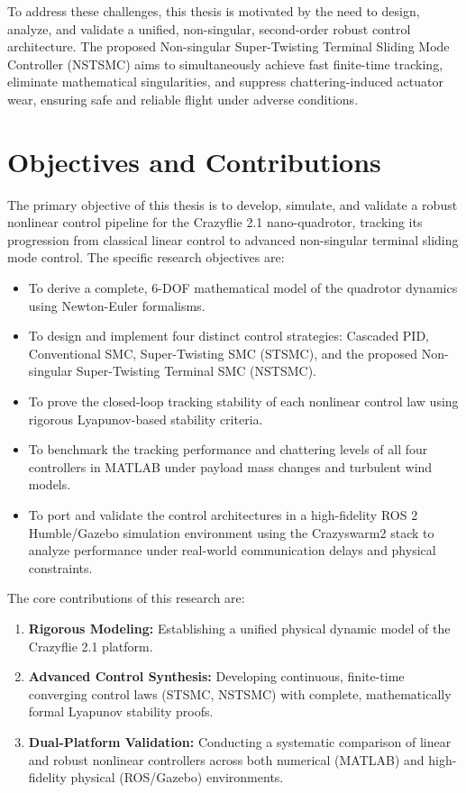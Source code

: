 To address these challenges, this thesis is motivated by the need to design, analyze, and validate a unified, non-singular, second-order robust control architecture. The proposed Non-singular Super-Twisting Terminal Sliding Mode Controller (NSTSMC) aims to simultaneously achieve fast finite-time tracking, eliminate mathematical singularities, and suppress chattering-induced actuator wear, ensuring safe and reliable flight under adverse conditions.

\section{Objectives and Contributions}
The primary objective of this thesis is to develop, simulate, and validate a robust nonlinear control pipeline for the Crazyflie 2.1 nano-quadrotor, tracking its progression from classical linear control to advanced non-singular terminal sliding mode control. The specific research objectives are:
\begin{itemize}
    \item To derive a complete, 6-DOF mathematical model of the quadrotor dynamics using Newton-Euler formalisms.
    \item To design and implement four distinct control strategies: Cascaded PID, Conventional SMC, Super-Twisting SMC (STSMC), and the proposed Non-singular Super-Twisting Terminal SMC (NSTSMC).
    \item To prove the closed-loop tracking stability of each nonlinear control law using rigorous Lyapunov-based stability criteria.
    \item To benchmark the tracking performance and chattering levels of all four controllers in MATLAB under payload mass changes and turbulent wind models.
    \item To port and validate the control architectures in a high-fidelity ROS 2 Humble/Gazebo simulation environment using the Crazyswarm2 stack to analyze performance under real-world communication delays and physical constraints.
\end{itemize}

The core contributions of this research are:
\begin{enumerate}
    \item \textbf{Rigorous Modeling:} Establishing a unified physical dynamic model of the Crazyflie 2.1 platform.
    \item \textbf{Advanced Control Synthesis:} Developing continuous, finite-time converging control laws (STSMC, NSTSMC) with complete, mathematically formal Lyapunov stability proofs.
    \item \textbf{Dual-Platform Validation:} Conducting a systematic comparison of linear and robust nonlinear controllers across both numerical (MATLAB) and high-fidelity physical (ROS/Gazebo) environments.
\end{enumerate}

